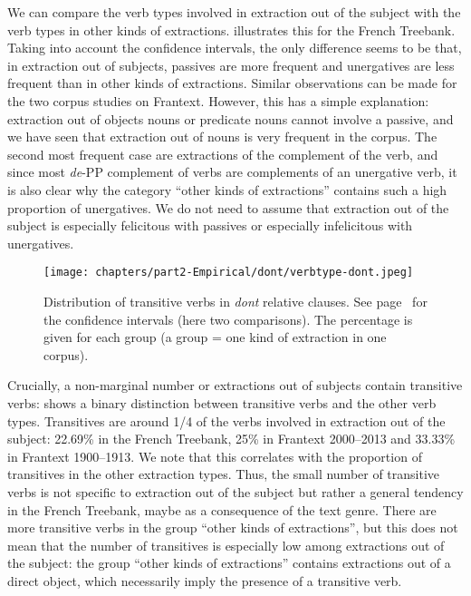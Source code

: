 We can compare the verb types involved in extraction out of the subject with the verb types in other kinds of extractions.  illustrates this for the French Treebank. Taking into account the confidence intervals, the only difference seems to be that, in extraction out of subjects, passives are more frequent and unergatives are less frequent than in other kinds of extractions. Similar observations can be made for the two corpus studies on Frantext. However, this has a simple explanation: extraction out of objects nouns or predicate nouns cannot involve a passive, and we have seen that extraction out of nouns is very frequent in the corpus. The second most frequent case are extractions of the complement of the verb, and since most \emph{de}-PP complement of verbs are complements of an unergative verb, it is also clear why the category ``other kinds of extractions'' contains such a high proportion of unergatives. We do not need to assume that extraction out of the subject is especially felicitous with passives or especially infelicitous with unergatives. 

\begin{figure}
    \texttt{[image: chapters/part2-Empirical/dont/verbtype-dont.jpeg]}
    \caption[Distribution of transitive verbs in \emph{dont} relative clauses]{Distribution of transitive verbs in \emph{dont} relative clauses. See page~\pageref{ch:conf-intervals-binomial} for the confidence intervals (here two comparisons). The percentage is given for each group (a group = one kind of extraction in one corpus).}
    \label{fig:dont-FTB-trans}
\end{figure}

Crucially, a non-marginal number or extractions out of subjects contain transitive verbs:  shows a binary distinction between transitive verbs and the other verb types. Transitives are around 1/4 of the verbs involved in extraction out of the subject: 22.69\% in the French Treebank, 25\% in Frantext 2000--2013 and 33.33\% in Frantext 1900--1913. We note that this correlates with the proportion of transitives in the other extraction types. Thus, the small number of transitive verbs is not specific to extraction out of the subject but rather a general tendency in the French Treebank, maybe as a consequence of the text genre. There are more transitive verbs in the group ``other kinds of extractions'', but this does not mean that the number of transitives is especially low among extractions out of the subject:  the group ``other kinds of extractions'' contains extractions out of a direct object, which necessarily imply the presence of a transitive verb.


